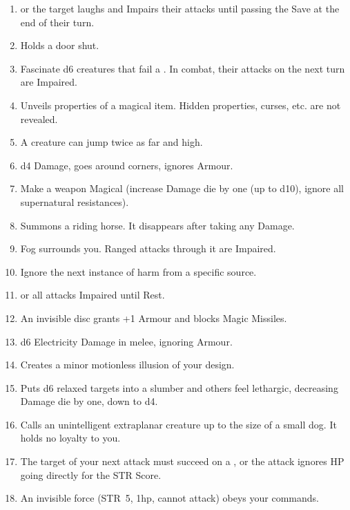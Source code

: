 \documentclass[itdr]{subfiles}
\begin{document}
\begin{enumerate}
	\item {}  or the target laughs and Impairs their attacks until passing the Save at the end of their turn.
	\item {} Holds a door shut.
	\item {} Fascinate d6 creatures that fail a . In combat, their attacks on the next turn are Impaired.
	\item {} Unveils properties of a magical item. Hidden properties, curses, etc. are not revealed.
	\item {} A creature can jump twice as far and high.
	\item {} d4 Damage, goes around corners, ignores Armour.
	\item {} Make a weapon Magical (increase Damage die by one (up to d10), ignore all supernatural resistances).
	\item {} Summons a riding horse. It disappears after taking any Damage.
	\item {} Fog surrounds you. Ranged attacks through it are Impaired.
	\item {} Ignore the next instance of harm from a specific source.
	\item {}  or all attacks Impaired until Rest.
	\item {} An invisible disc grants +1 Armour and blocks Magic Missiles.
	\item {} d6 Electricity Damage in melee, ignoring Armour.
	\item {} Creates a minor motionless \mbox{illusion} of your design.
	\item {} Puts d6 relaxed targets into a slumber and others feel lethargic, decreasing Damage die by one, down to d4.
	\item {} Calls an unintelligent extraplanar creature up to the size of a small dog. It holds no loyalty to you.
	\item {} The target of your next attack must succeed on a , or the attack ignores HP going directly for the STR Score.
	\item {} An invisible force (STR~5, 1hp, cannot attack) obeys your commands.
\end{enumerate}
\end{document}
